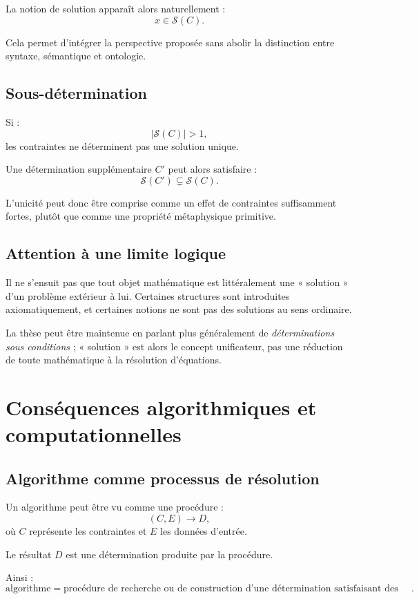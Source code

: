 \documentclass[11pt,a4paper]{article}
\begin{document}
La notion de solution apparaît alors naturellement :
\[
x\in\mathcal S(C).
\]

Cela permet d'intégrer la perspective proposée sans abolir la distinction
entre syntaxe, sémantique et ontologie.

\subsection{Sous-détermination}

Si :
\[
|\mathcal S(C)|>1,
\]
les contraintes ne déterminent pas une solution unique.

Une détermination supplémentaire \(C'\) peut alors satisfaire :
\[
\mathcal S(C')\subsetneq\mathcal S(C).
\]

L'unicité peut donc être comprise comme un effet de contraintes suffisamment
fortes, plutôt que comme une propriété métaphysique primitive.

\subsection{Attention à une limite logique}

Il ne s'ensuit pas que tout objet mathématique est littéralement une
« solution » d'un problème extérieur à lui. Certaines structures sont
introduites axiomatiquement, et certaines notions ne sont pas des solutions
au sens ordinaire.

La thèse peut être maintenue en parlant plus généralement de
\emph{déterminations sous conditions} ; « solution » est alors le concept
unificateur, pas une réduction de toute mathématique à la résolution
d'équations.

\section{Conséquences algorithmiques et computationnelles}

\subsection{Algorithme comme processus de résolution}

Un algorithme peut être vu comme une procédure :
\[
(C,E)\longrightarrow D,
\]
où \(C\) représente les contraintes et \(E\) les données d'entrée.

Le résultat \(D\) est une détermination produite par la procédure.

Ainsi :
\[
\boxed{
\text{algorithme}=
\text{procédure de recherche ou de construction d'une détermination
satisfaisant des contraintes}.
}
\]
\end{document}

